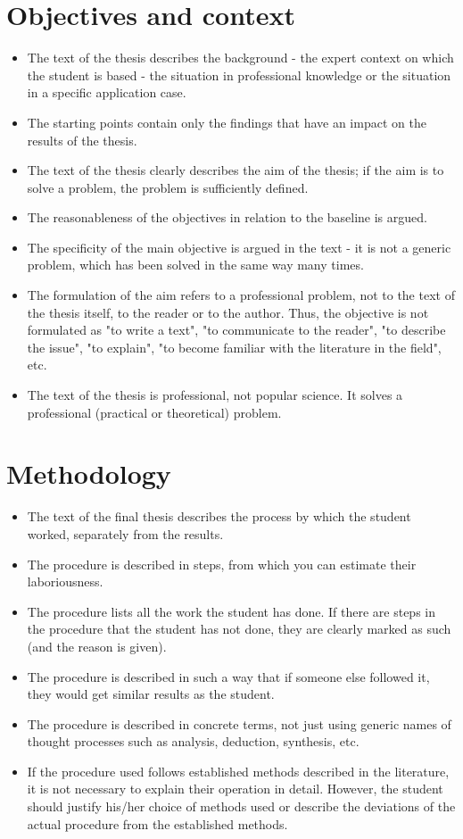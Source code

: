 \section*{Objectives and context}
\begin{itemize}
\item \vspace*{-2ex}The text of the thesis describes the background - the expert context on which the student is based - the situation in professional knowledge or the situation in a specific application case.
\item The starting points contain only the findings that have an impact on the results of the thesis.
\item The text of the thesis clearly describes the aim of the thesis; if the aim is to solve a problem, the problem is sufficiently defined.
\item The reasonableness of the objectives in relation to the baseline is argued.
\item The specificity of the main objective is argued in the text - it is not a generic problem, which has been solved in the same way many times.
\item The formulation of the aim refers to a professional problem, not to the text of the thesis itself, to the reader or to the author. Thus, the objective is not formulated as "to write a text", "to communicate to the reader", "to describe the issue", "to explain", "to become familiar with the literature in the field", etc.
\item The text of the thesis is professional, not popular science. It solves a professional (practical or theoretical) problem.
\end{itemize}

\section*{Methodology}
\begin{itemize}
\item \vspace*{-2ex}The text of the final thesis describes the process by which the student worked, separately from the results.
\item The procedure is described in steps, from which you can estimate their laboriousness.
\item The procedure lists all the work the student has done. If there are steps in the procedure that the student has not done, they are clearly marked as such (and the reason is given).
\item The procedure is described in such a way that if someone else followed it, they would get similar results as the student.
\item The procedure is described in concrete terms, not just using generic names of thought processes such as analysis, deduction, synthesis, etc.
\item If the procedure used follows established methods described in the literature, it is not necessary to explain their operation in detail. However, the student should justify his/her choice of methods used or describe the deviations of the actual procedure from the established methods.
\end{itemize}

